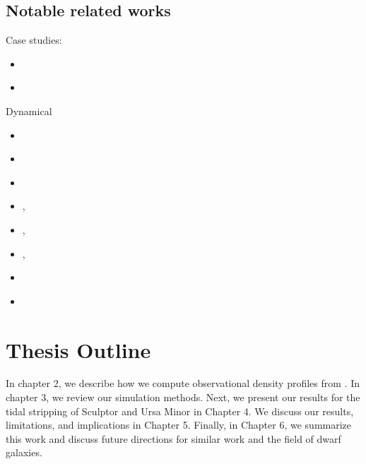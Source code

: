 \subsection{Notable related works}\label{notable-related-works}

Case studies:

\begin{itemize}
\tightlist
\item
  \citet{dicintio+2024}
\item
  \citet{iorio+2019}
\end{itemize}

Dynamical

\begin{itemize}
\tightlist
\item
  \citet{read+2006}
\item
  \citet{bullock+johnston+2005}
\item
  \citet{PNM2008}
\item
  \citet{borukhovetskaya+2022a}, \citet{borukhovetskaya+2022}
\item
  \citet{errani+2023a}, \citet{fattahi+2018}
\item
  \citet{wang+2017},
\item
  \citet{pryor1996}
\item
  \citet{klimentowski+2009}
\end{itemize}

\section{Thesis Outline}\label{thesis-outline}

In chapter 2, we describe how we compute observational density profiles
from \citet{jensen+202}. In chapter 3, we review our simulation methods.
Next, we present our results for the tidal stripping of Sculptor and
Ursa Minor in Chapter 4. We discuss our results, limitations, and
implications in Chapter 5. Finally, in Chapter 6, we summarize this work
and discuss future directions for similar work and the field of dwarf
galaxies.

